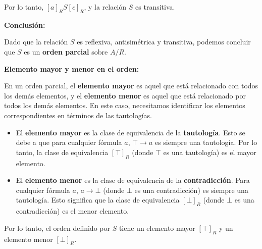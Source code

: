 \begin{solution}
\begin{enumerate}[label=\arabic*.]
Por lo tanto, \( [a]_R S [c]_R \), y la relación \( S \) es transitiva.
\end{enumerate}

\textbf{Conclusión:}

Dado que la relación \( S \) es reflexiva, antisimétrica y transitiva, podemos concluir que \( S \) es un \textbf{orden parcial} sobre \( A/R \).

\textbf{Elemento mayor y menor en el orden:}

En un orden parcial, el \textbf{elemento mayor} es aquel que está relacionado con todos los demás elementos, y el \textbf{elemento menor} es aquel que está relacionado por todos los demás elementos. En este caso, necesitamos identificar los elementos correspondientes en términos de las tautologías.

\begin{itemize}
    \item El \textbf{elemento mayor} es la clase de equivalencia de la \textbf{tautología}. Esto se debe a que para cualquier fórmula \( a \), \( \top \rightarrow a \) es siempre una tautología. Por lo tanto, la clase de equivalencia \( [\top]_R \) (donde \( \top \) es una tautología) es el mayor elemento.
  
    \item El \textbf{elemento menor} es la clase de equivalencia de la \textbf{contradicción}. Para cualquier fórmula \( a \), \( a \rightarrow \bot \) (donde \( \bot \) es una contradicción) es siempre una tautología. Esto significa que la clase de equivalencia \( [\bot]_R \) (donde \( \bot \) es una contradicción) es el menor elemento.
\end{itemize}

Por lo tanto, el orden definido por \( S \) tiene un elemento mayor \( [\top]_R \) y un elemento menor \( [\bot]_R \).
\end{solution}